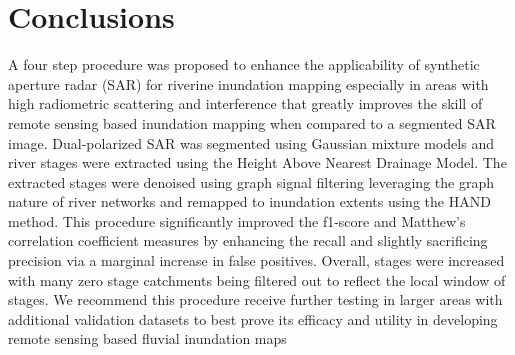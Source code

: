 \documentclass{article}
\begin{document}
\section{Conclusions}
\label{sec:conclusions}
%
A four step procedure was proposed to enhance the applicability of synthetic aperture radar (SAR) for riverine inundation mapping especially in areas with high radiometric scattering and interference that greatly improves the skill of remote sensing based inundation mapping when compared to a segmented SAR image.
Dual-polarized SAR was segmented using Gaussian mixture models and river stages were extracted using the Height Above Nearest Drainage Model. 
The extracted stages were denoised using graph signal filtering leveraging the graph nature of river networks and remapped to inundation extents using the HAND method.
This procedure significantly improved the f1-score and Matthew's correlation coefficient measures by enhancing the recall and slightly sacrificing precision via a marginal increase in false positives.
Overall, stages were increased with many zero stage catchments being filtered out to reflect the local window of stages. 
We recommend this procedure receive further testing in larger areas with additional validation datasets to best prove its efficacy and utility in developing remote sensing based fluvial inundation maps
%



%
\end{document}
